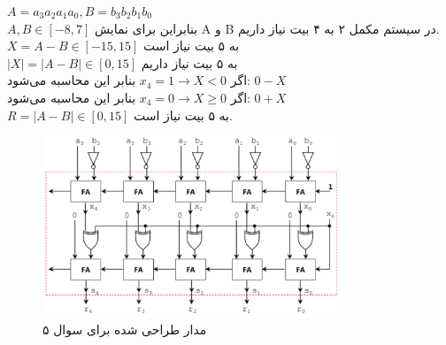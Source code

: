 $ A=a_3a_2a_1a_0, B=b_3b_2b_1b_0 $\\
$A,B\in [-8,7] $ بنابراین برای نمایش A و B در سیستم مکمل ۲ به ۴ بیت نیاز داریم.\\
$X=A-B \in [-15, 15]$ به ۵ بیت نیاز است\\
$|X|=|A-B| \in [0, 15]$ به ۵ بیت نیاز داریم\\
اگر $x_4=1 \rightarrow X < 0 $ بنابر این محاسبه می‌شود: $0-X$\\
اگر $x_4=0 \rightarrow X \ge 0 $ بنابر این محاسبه می‌شود: $0+X$\\
$R=|A-B| \in [0,15]$ به ۵ بیت نیاز است.


\begin{figure}[h]
	\centering
	\includegraphics[width=0.8\textwidth]{fig/Q5.png}
	\caption{مدار طراحی شده برای سوال ۵}
	\label{Q5_Design}
\end{figure}